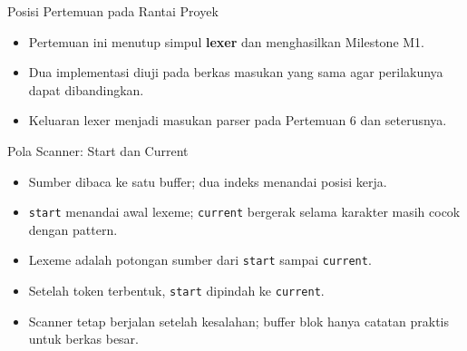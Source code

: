 \documentclass[aspectratio=169,10pt,t]{beamer}
\begin{document}
\begin{frame}{Posisi Pertemuan pada Rantai Proyek}

  \vspace{2pt}
  \begin{itemize}
    \item Pertemuan ini menutup simpul \textbf{lexer} dan menghasilkan
          Milestone M1.
    \item Dua implementasi diuji pada berkas masukan yang sama agar
          perilakunya dapat dibandingkan.
    \item Keluaran lexer menjadi masukan parser pada Pertemuan 6 dan
          seterusnya.
  \end{itemize}
\end{frame}

\begin{frame}{Pola Scanner: Start dan Current}
  \begin{center}
  \end{center}

  \begin{itemize}
    \item Sumber dibaca ke satu buffer; dua indeks menandai posisi kerja.
    \item \texttt{start} menandai awal lexeme; \texttt{current} bergerak
          selama karakter masih cocok dengan pattern.
    \item Lexeme adalah potongan sumber dari \texttt{start} sampai
          \texttt{current}.
    \item Setelah token terbentuk, \texttt{start} dipindah ke
          \texttt{current}.
    \item Scanner tetap berjalan setelah kesalahan; buffer blok hanya
          catatan praktis untuk berkas besar.
  \end{itemize}
\end{frame}
\end{document}
